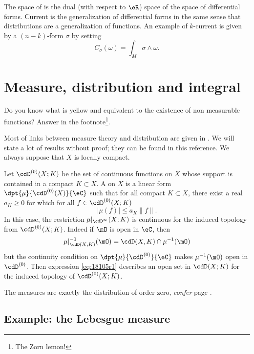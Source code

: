 The space of  is the dual (with respect to $\eR$) space of the space of differential forms. Current is the generalization of differential forms in the same sense that distributions are a generalization of functions. An example of $k$-current is given by a $(n-k)$-form $\sigma$ by setting
\[
	C_{\sigma}(\omega)=\int_M \sigma\wedge\omega.
\]

\section{Measure, distribution and integral} \label{sec_distrib_mesure}

Do you know what is yellow and equivalent to the existence of non measurable functions? Answer in the footnote\footnote{The Zorn lemon!}.

Most of links between measure theory and distribution are given in \cite{Dieu2}. We will state a lot of results without proof; they can be found in this reference. We always suppose that $X$ is locally compact.

Let $\cdD^{(0)}(X;K)$ be the set of continuous functions on $X$ whose support is contained in a compact $K\subset X$. A  on $X$ is a linear form $\dpt{\mu}{\cdD^{(0)}(X)}{\eC}$ such that for all compact $K\subset X$, there exist a real $a_K\geq 0$ for which for all $f\in\cdD^{(0)}(X;K)$
\begin{equation}
	| \mu(f) |\leq a_K\| f \|.
\end{equation}
In this case, the restriction $\mu|_{\cdD^{\infty}}(X;K)$ is continuous for the induced topology from $\cdD^{(0)}(X;K)$. Indeed if $\mO$ is open in $\eC$, then
\begin{equation}  \label{eq:18105r1}
	\mu|_{\cdD(X;K)}^{-1}(\mO)=\cdD(X,K)\cap\mu^{-1}(\mO)
\end{equation}
but the continuity condition on $\dpt{\mu}{\cdD^{(0)}}{\eC}$ makes $\mu^{-1}(\mO)$ open in $\cdD^{(0)}$. Then expression \eqref{eq:18105r1} describes an open set in $\cdD(X;K)$ for the induced topology of $\cdD^{(0)}(X;K)$.

The measures are exactly the distribution of order zero, \emph{confer} page \pageref{pg:reforder}.

\subsection{Example: the Lebesgue measure}


